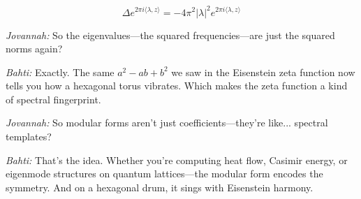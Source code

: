\[
\Delta e^{2\pi i \langle \lambda, z \rangle} = -4\pi^2 |\lambda|^2 e^{2\pi i \langle \lambda, z \rangle}
\]

\medskip

\noindent
\textit{Jovannah:} So the eigenvalues—the squared frequencies—are just the squared norms again?

\medskip

\noindent
\textit{Bahti:} Exactly. The same \( a^2 - ab + b^2 \) we saw in the Eisenstein zeta function now tells you how a hexagonal torus vibrates. Which makes the zeta function a kind of spectral fingerprint.

\medskip

\noindent
\textit{Jovannah:} So modular forms aren’t just coefficients—they’re like... spectral templates?

\medskip

\noindent
\textit{Bahti:} That’s the idea. Whether you're computing heat flow, Casimir energy, or eigenmode structures on quantum lattices—the modular form encodes the symmetry. And on a hexagonal drum, it sings with Eisenstein harmony.





